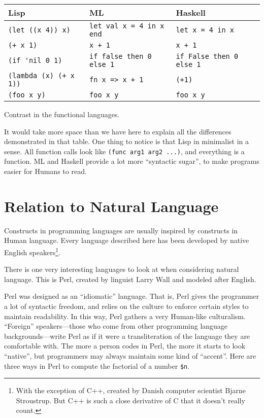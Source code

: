 \documentclass[12pt]{article}
\begin{document}
\begin{Figure}
\label{fig:functional-comparison}
\begin{tabular}{l|l|l}
\textbf{Lisp}            & \textbf{ML}                   & \textbf{Haskell} \\
\hline
\verb+(let ((x 4)) x)+   & \verb+let val x = 4 in x end+ & \verb+let x = 4 in x+ \\
\verb|(+ x 1)|           & \verb|x + 1|                  & \verb|x + 1| \\
\verb|(if 'nil 0 1)|     & \verb+if false then 0 else 1+ & \verb+if False then 0 else 1+ \\
\verb|(lambda (x) (+ x 1))| & \verb|fn x => x + 1|       & \verb|(+1)| \\
\verb|(foo x y)|         & \verb|foo x y|                & \verb|foo x y| \\
\end{tabular}
\caption{Contrast in the functional languages.}
\end{Figure}

It would take more space than we have here to explain all the
differences demonstrated in that table.  One thing to notice is that
Lisp in minimalist in a sense.  All function calls look like
\texttt{(func arg1 arg2 ...)}, and everything is a function.  ML and
Haskell provide a lot more ``syntactic sugar'', to make programs easier
for Humans to read.

\section{Relation to Natural Language}

Constructs in programming languages are usually inspired by constructs
in Human language.  Every language described here has been developed by
native English speakers\footnote{With the exception of C++, created by
Danish computer scientist Bjarne Stroustrup.  But C++ is such a close
derivative of C that it doesn't really count.}.

There is one very interesting languages to look at when considering
natural language.  This is Perl, created by linguist Larry Wall and
modeled after English.

Perl was designed as an ``idiomatic'' language.  That is, Perl gives the
programmer a lot of syntactic freedom, and relies on the culture to
enforce certain styles to maintain readability.  In this way, Perl
gathers a very Human-like culturalism.  ``Foreign'' speakers---those who
come from other programming language backgrounds---write Perl as if it
were a transliteration of the language they are comfortable with.  The
more a person codes in Perl, the more it starts to look ``native'', but
programmers may always maintain some kind of ``accent''.    Here are
three ways in Perl to compute the factorial of a number \texttt{\$n}.
\end{document}
